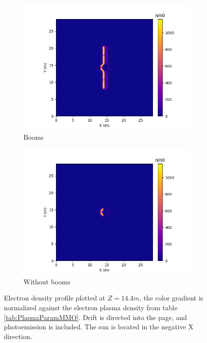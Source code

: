 \begin{figure}[H]
  \begin{subfigure}[b]{0.6\textwidth}
  \includegraphics[width=\textwidth]{figures/MMO/minZ/WB/E_minZ_WB.png}
  \caption{Booms}
  \label{fig:E_minZ_WB}
\end{subfigure}
\begin{subfigure}[b]{0.6\textwidth}
  \includegraphics[width=\textwidth]{figures/MMO/minZ/NB/E_minZ_NB.png}
  \caption{Without booms}
  \label{fig:E_minZ_NB}
\end{subfigure}
\label{fig:Elec_minZ}
\caption{Electron density profile plotted at $Z = 14.4 m$, the color gradient is normalized against the electron plasma density from table \ref{tab:PlasmaParamMMO}. Drift is directed into the page, and photoemission is included. The sun is located in the negative X direction.}
\end{figure}



